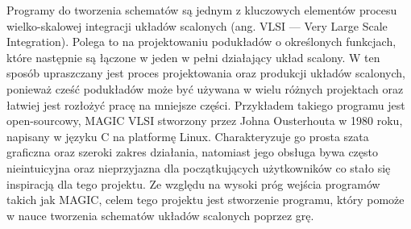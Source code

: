 Programy do tworzenia schematów są jednym z kluczowych elementów
procesu wielko-skalowej integracji układów scalonych (ang. VLSI — Very Large Scale Integration)\cite{VLSI}.
Polega to na projektowaniu podukładów o określonych funkcjach,
które następnie są łączone w jeden w pełni działający układ scalony.
W ten sposób upraszczany jest proces projektowania oraz produkcji układów scalonych,
ponieważ cześć podukładów może być używana w wielu różnych projektach
oraz łatwiej jest rozłożyć pracę na mniejsze części.
Przykładem takiego programu jest open-sourcowy, MAGIC VLSI stworzony przez Johna Ousterhouta w 1980 roku\cite{MAGIC},
napisany w języku C na platformę Linux\cite{MAGIC_wiki}.
Charakteryzuje go prosta szata graficzna oraz szeroki zakres działania,
natomiast jego obsługa bywa często nieintuicyjna oraz nieprzyjazna dla początkujących użytkowników
co stało się inspiracją dla tego projektu.
Ze względu na wysoki próg wejścia programów takich jak MAGIC, celem tego projektu jest stworzenie
programu, który pomoże w nauce tworzenia schematów układów scalonych poprzez grę.
